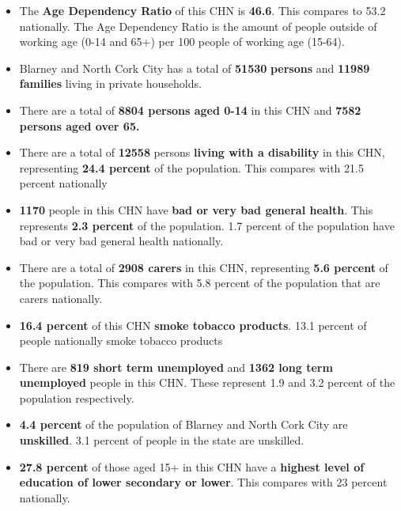 \documentclass{article}
\begin{document}
\begin{itemize}

\item The \textbf{Age Dependency Ratio} of this CHN is  \textbf{46.6}. This compares to 53.2 nationally. The Age Dependency Ratio is the amount of people outside of working age (0-14 and 65+) per 100 people of working age (15-64). 

\item Blarney and North Cork City has a total of \textbf{\num{51530}} \textbf{persons} and  \textbf{\num{11989}} \textbf{families} living in private households.

\item There are a total of \textbf{\num{8804} persons aged 0-14} in this CHN and \textbf{\num{7582} persons aged over 65.} 

\item There are a total of \textbf{\num{12558}} persons \textbf{living with a disability} in this CHN, representing \textbf{24.4 percent} of the population. This compares with  21.5 percent nationally

\item \textbf{\num{1170}} people in this CHN have \textbf{bad or very bad general health}. This represents \textbf{2.3 percent} of the population. 1.7 percent of the population have bad or very bad general health nationally. 

\item There are a total of \textbf{\num{2908} carers} in this CHN, representing \textbf{5.6 percent} of the population. This compares with 5.8 percent of the population that are carers nationally. 

\item \textbf{16.4 percent} of this CHN \textbf{smoke tobacco products}. 13.1 percent of people nationally smoke tobacco products

\item There are \textbf{\num{819} short term unemployed} and \textbf{\num{1362} long term unemployed} people in this CHN. These represent 1.9 and 3.2 percent of the population respectively.

\item  \textbf{4.4 percent} of the population of Blarney and North Cork City are \textbf{unskilled}. 3.1 percent of people in the state are unskilled.

\item \textbf{27.8 percent} of those aged 15+ in this CHN have a \textbf{highest level of education of lower secondary or lower}. This compares with 23 percent nationally. 


\end{itemize}
\end{document}
